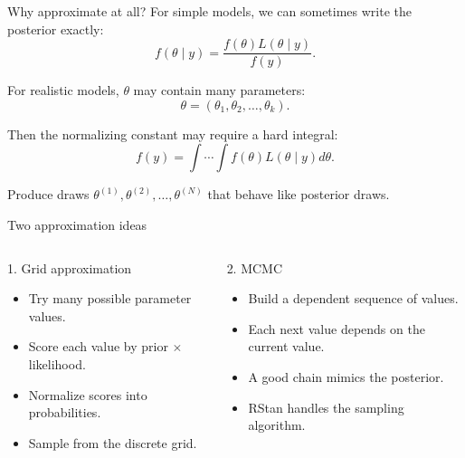 \documentclass[aspectratio=43,11pt]{beamer}
\newcommand{\tightitems}{\setlength\itemsep{0.25em}}
\begin{document}
\begin{frame}{Why approximate at all?}
For simple models, we can sometimes write the posterior exactly:
\[
f(\theta\mid y)=\frac{f(\theta)L(\theta\mid y)}{f(y)}.
\]

For realistic models, $\theta$ may contain many parameters:
\[
\theta=(\theta_1,\theta_2,\ldots,\theta_k).
\]

Then the normalizing constant may require a hard integral:
\[
f(y)=\int\cdots\int f(\theta)L(\theta\mid y)d\theta.
\]

\begin{block}{}
Produce draws $\theta^{(1)},\theta^{(2)},\ldots,\theta^{(N)}$ that behave like posterior draws.
\end{block}
\end{frame}

\begin{frame}{Two approximation ideas}
\begin{columns}[T]
\begin{block}{1. Grid approximation}
\begin{itemize}\tightitems
  \item Try many possible parameter values.
  \item Score each value by prior $\times$ likelihood.
  \item Normalize scores into probabilities.
  \item Sample from the discrete grid.
\end{itemize}
\end{block}

\begin{block}{2. MCMC}
\begin{itemize}\tightitems
  \item Build a dependent sequence of values.
  \item Each next value depends on the current value.
  \item A good chain mimics the posterior.
  \item RStan handles the sampling algorithm.
\end{itemize}
\end{block}
\end{columns}

\vspace{0.3em}
\begin{center}
\end{center}
\end{frame}
\end{document}
